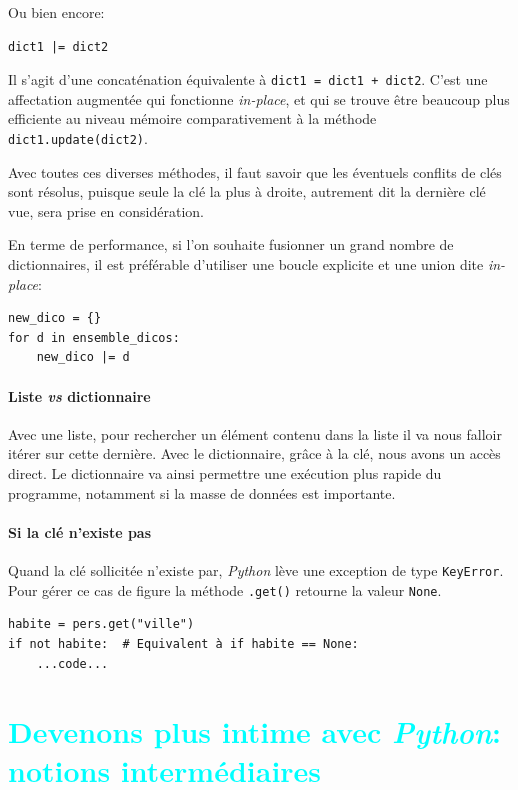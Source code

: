 \documentclass[a4paper,11pt]{book}
\begin{document}
Ou bien encore:
\begin{lstlisting}
dict1 |= dict2
\end{lstlisting}
\medskip

Il s'agit d'une concaténation équivalente à \texttt{dict1 = dict1 + dict2}. C'est une affectation augmentée qui fonctionne \og \textit{in-place}\fg{}, et qui se trouve être beaucoup plus efficiente au niveau mémoire comparativement à la méthode \texttt{dict1.update(dict2)}.
\medskip

Avec toutes ces diverses méthodes, il faut savoir que les éventuels conflits de clés sont résolus, puisque seule la clé la plus à droite, autrement dit la dernière clé vue, sera prise en considération.
\medskip

En terme de performance, si l'on souhaite fusionner un grand nombre de dictionnaires, il est préférable d'utiliser une boucle explicite et une union dite \og \textit{in-place}\fg{}:
\begin{lstlisting}
new_dico = {}
for d in ensemble_dicos:
    new_dico |= d
\end{lstlisting}
\medskip
 
\subsection*{Liste \textit{vs} dictionnaire}
Avec une liste, pour rechercher un élément contenu dans la liste il va nous falloir itérer sur cette dernière. Avec le dictionnaire, grâce à la clé, nous avons un accès direct. Le dictionnaire va ainsi permettre une exécution plus rapide du programme, notamment si la masse de données est importante.
\medskip

\subsection*{Si la clé n'existe pas}
Quand la clé sollicitée n'existe par, \textit{Python} lève une exception de type \texttt{KeyError}. Pour gérer ce cas de figure la méthode \texttt{.get()} retourne la valeur \texttt{None}.
\begin{lstlisting}
habite = pers.get("ville")
if not habite:  # Equivalent à if habite == None:
	...code...
\end{lstlisting}
\medskip

\part{\textcolor{cyan}{Devenons plus intime avec \textit{Python}: notions intermédiaires}}
\end{document}
